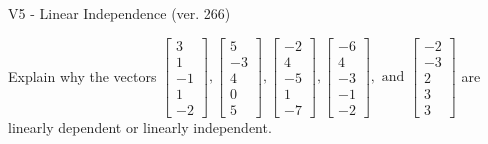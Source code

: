 \begin{exercise}
  \begin{exerciseTitle}V5 - Linear Independence (ver. 266)\end{exerciseTitle}
  \begin{exerciseStatement}
    Explain why the vectors \(\left[\begin{array}{r}
3 \\
1 \\
-1 \\
1 \\
-2
\end{array}\right] , \left[\begin{array}{r}
5 \\
-3 \\
4 \\
0 \\
5
\end{array}\right] , \left[\begin{array}{r}
-2 \\
4 \\
-5 \\
1 \\
-7
\end{array}\right] , \left[\begin{array}{r}
-6 \\
4 \\
-3 \\
-1 \\
-2
\end{array}\right] , \text{ and } \left[\begin{array}{r}
-2 \\
-3 \\
2 \\
3 \\
3
\end{array}\right]\) are linearly dependent or linearly independent.	



\end{exerciseStatement}
\end{exercise}
